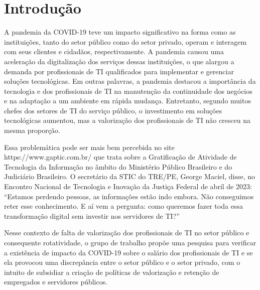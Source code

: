 \section{Introdução}

A pandemia da COVID-19 teve um impacto significativo na forma como as instituições, tanto do setor público como do setor privado, operam e interagem com seus clientes e cidadãos, respectivamente. A pandemia causou uma aceleração da digitalização dos serviços dessas instituições, o que alargou a demanda por profissionais de TI qualificados para implementar e gerenciar soluções tecnológicas. Em outras palavras, a pandemia destacou a importância da tecnologia e dos profissionais de TI na manutenção da continuidade dos negócios e na adaptação a um ambiente em rápida mudança. Entretanto, segundo muitos chefes dos setores de TI do serviço público, o investimento em soluções tecnológicas aumentou, mas a valorização dos profissionais de TI não cresceu na mesma proporção. 
		
Essa problemática pode ser mais bem percebida no site https://www.gaptic.com.br/ que trata sobre a Gratificação de Atividade de Tecnologia da Informação no âmbito do Ministério Público Brasileiro e do Judiciário Brasileiro. O secretário da STIC do TRE/PE, George Maciel, disse, no Encontro Nacional de Tecnologia e Inovação da Justiça Federal de abril de 2023: “Estamos perdendo pessoas, as informações estão indo embora. Não conseguimos reter esse conhecimento. E aí vem a pergunta: como queremos fazer toda essa transformação digital sem investir nos servidores de TI?”
		
Nesse contexto de falta de valorização dos profissionais de TI no setor público e consequente rotatividade, o grupo de trabalho propõe uma pesquisa para verificar a existência de impacto da COVID-19 sobre o salário dos profissionais de TI e se ela provocou uma discrepância entre o setor público e o setor privado, com o intuito de subsidiar a criação de políticas de valorização e retenção de empregados e servidores públicos.